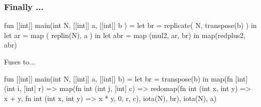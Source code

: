 \documentclass{beamer}
\begin{document}
\begin{frame}[fragile,t]
  \frametitle{Finally ... }

\begin{colorcode}
fun [[int]] main(int N, [[int]] a, [[int]] b ) =
    let br  = replicate( N, transpose(b) ) in
    let ar  = map      ( replin(N),    a ) in
    let abr = map  (mul2, ar, br)      in
        map(redplus2, abr)
\end{colorcode}

Fuses to...

\begin{colorcode}
fun [[int]] main(int N, [[int]] a, [[int]] b) =
  let br = transpose(b) in
  map(fn [int] (int i, [int] r) =>
      map(fn int (int j, [int] c) =>
          redomap(fn int (int x, int y) => x + y,
                  fn int (int x, int y) => x * y,
                  0, r, c),
          iota(N), br),
      iota(N), a)
\end{colorcode}

\end{frame}
\end{document}
